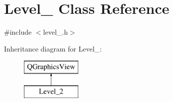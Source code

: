 \hypertarget{class_level__2}{}\section{Level\+\_ Class Reference}
\label{class_level__2}


{\ttfamily \#include $<$level\+\_.\+h$>$}

Inheritance diagram for Level\+\_\+:\begin{figure}[H]
\begin{center}
\leavevmode
\includegraphics[height=2.000000cm]{class_level__2}
\end{center}
\end{figure}
